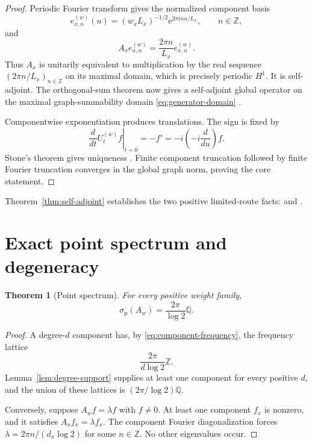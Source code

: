 \documentclass[11pt]{article}
\newtheorem{theorem}{Theorem}
\theoremstyle{definition}
\theoremstyle{remark}
\newcommand{\Q}{\mathbb{Q}}
\newcommand{\Z}{\mathbb{Z}}
\newcommand{\e}{\mathrm{e}}
\begin{document}
\begin{proof}
Periodic Fourier transform gives the normalized component basis
\begin{equation}
 e_{x,n}^{(w)}(u)=(w_xL_x)^{-1/2}\e^{2\pi inu/L_x},
 \qquad n\in\Z,
 \label{eq:fourier-basis}
\end{equation}
and
\begin{equation}
 A_xe_{x,n}^{(w)}=\frac{2\pi n}{L_x}e_{x,n}^{(w)}.
 \label{eq:component-frequency}
\end{equation}
Thus \(A_x\) is unitarily equivalent to multiplication by the real sequence
\((2\pi n/L_x)_{n\in\Z}\) on its maximal domain, which is precisely periodic
\(H^1\).  It is self-adjoint.  The orthogonal-sum theorem now gives a
self-adjoint global operator on the maximal graph-summability domain
\eqref{eq:generator-domain} \citep[Thm.~2.23]{Teschl2009}.

Componentwise exponentiation produces translations.  The sign is fixed by
\[
 \left.\frac d{dt}U_t^{(w)}f\right|_{t=0}=-f'
 =-i\left(-i\frac d{du}\right)f.
\]
Stone's theorem gives uniqueness \citep{Stone1932,Teschl2009}.  Finite
component truncation followed by finite Fourier truncation converges in the
global graph norm, proving the core statement.
\end{proof}

Theorem~\ref{thm:self-adjoint} establishes the two positive limited-route
facts:  and
.

\section{Exact point spectrum and degeneracy}
\label{sec:point-spectrum}

\begin{theorem}[Point spectrum]
\label{thm:point-spectrum}
For every positive weight family,
\begin{equation}
 \boxed{\displaystyle
 \sigma_{\mathrm p}(A_w)=\frac{2\pi}{\log2}\Q.}
 \label{eq:point-spectrum}
\end{equation}
\end{theorem}

\begin{proof}
A degree-\(d\) component has, by \eqref{eq:component-frequency}, the
frequency lattice
\[
 \frac{2\pi}{d\log2}\Z.
\]
Lemma~\ref{lem:degree-support} supplies at least one component for every
positive \(d\), and the union of these lattices is
\((2\pi/\log2)\Q\).

Conversely, suppose \(A_wf=\lambda f\) with \(f\neq0\).  At least one
component \(f_x\) is nonzero, and it satisfies \(A_xf_x=\lambda f_x\).
The component Fourier diagonalization forces
\(\lambda=2\pi n/(d_x\log2)\) for some \(n\in\Z\).  No other eigenvalues
occur.
\end{proof}
\end{document}

